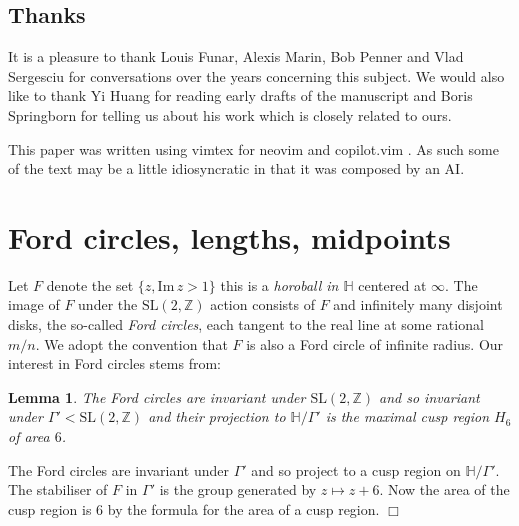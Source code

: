 \documentclass[12pt,a4paper]{amsart}
\newtheorem{lem}[thm]{Lemma}
\def\HH{\mathbb{H}}
\def\im{\mathrm{Im}\,}
\def\xx{\HH/\Gamma'}
\def\ZZ{\mathbb{Z}}
\def\sl2{\mathrm{SL}(2, \ZZ)}
\begin{document}
 

\subsection{Thanks}

It is a pleasure to thank Louis Funar, Alexis Marin, Bob Penner and Vlad
Sergesciu for  conversations over the years concerning this subject. We would
also like to thank Yi Huang for reading early drafts of the manuscript and
Boris Springborn  for telling us about his work \cite{spring} which is closely
related to ours.

This paper was written using vimtex for neovim and copilot.vim \cite{copilot}.
As such some of the text may be a little idiosyncratic in that it was composed
by an AI.

\section{Ford circles, lengths, midpoints} 
\label{lengths}

Let $F$ denote the set  $\{ z, \im z > 1\}$ this is a \textit{horoball in
$\HH$} centered at $\infty$. The image of $F$ under the $\sl2$ action consists
of $F$ and infinitely many disjoint disks, the so-called \textit{Ford
circles}, each tangent to the real line at some rational $m/n$. We adopt the
convention that $F$ is also a Ford circle of infinite radius. Our interest in
Ford circles stems from:

\begin{lem} 

	The Ford circles are invariant under $\sl2$ and so invariant under
	$\Gamma'< \sl2$ and their projection to $\xx$ is the maximal cusp
	region $H_6$ of area $6$. 

\end{lem}

\proof
The Ford circles are invariant under $\Gamma'$ and so project to a cusp
region on $\xx$. The stabiliser of $F$ in $\Gamma'$ is the group generated by
$z \mapsto z + 6$. Now the area of the cusp region is $6$ by the formula for
the area of a cusp region. 
\hfill $\Box$
\end{document}

